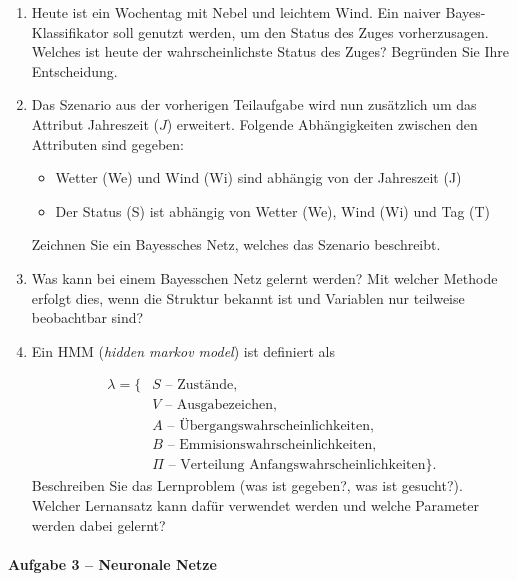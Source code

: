 \documentclass[fleqn]{latex-classes/summary}
\begin{document}
\begin{enumerate}
  \item Heute ist ein Wochentag mit Nebel und leichtem Wind. Ein naiver Bayes-Klassifikator soll genutzt werden, um den Status des Zuges vorherzusagen. Welches ist heute der wahrscheinlichste Status des Zuges? Begründen Sie Ihre Entscheidung.

  \item Das Szenario aus der vorherigen Teilaufgabe wird nun zusätzlich um das Attribut Jahreszeit (\( J \)) erweitert. Folgende Abhängigkeiten zwischen den Attributen sind gegeben:
  \begin{itemize}
    \item Wetter (We) und Wind (Wi) sind abhängig von der Jahreszeit (J)
    \item Der Status (S) ist abhängig von Wetter (We), Wind (Wi) und Tag (T)
  \end{itemize}
  Zeichnen Sie ein Bayessches Netz, welches das Szenario beschreibt.

  \item Was kann bei einem Bayesschen Netz gelernt werden? Mit welcher Methode erfolgt dies, wenn die Struktur bekannt ist und Variablen nur teilweise beobachtbar sind?
  
  \item Ein HMM (\emph{hidden markov model}) ist definiert als
  
  \begin{align*}
    \lambda = \{ &S \text{ -- Zustände}, \\
    &V \text{ -- Ausgabezeichen}, \\
    &A \text{ -- Übergangswahrscheinlichkeiten}, \\
    &B \text{ -- Emmisionswahrscheinlichkeiten}, \\
    &\Pi \text{ -- Verteilung Anfangswahrscheinlichkeiten} \}\text{.}
  \end{align*}
  Beschreiben Sie das Lernproblem (was ist gegeben?, was ist gesucht?). Welcher Lernansatz kann dafür verwendet werden und welche Parameter werden dabei gelernt?
\end{enumerate}

\newpage

\paragraph{Aufgabe 3 -- Neuronale Netze}
\end{document}
